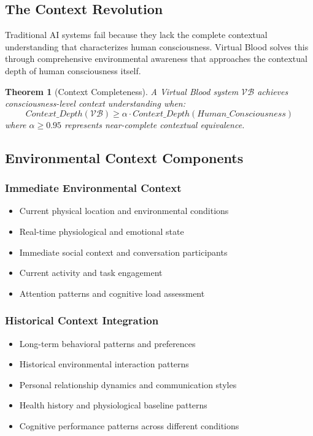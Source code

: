 \documentclass[12pt,a4paper]{article}
\newtheorem{theorem}{Theorem}
\begin{document}
\subsection{The Context Revolution}

Traditional AI systems fail because they lack the complete contextual understanding that characterizes human consciousness. Virtual Blood solves this through comprehensive environmental awareness that approaches the contextual depth of human consciousness itself.

\begin{theorem}[Context Completeness]
A Virtual Blood system $\mathcal{VB}$ achieves consciousness-level context understanding when:
\begin{equation}
Context\_Depth(\mathcal{VB}) \geq \alpha \cdot Context\_Depth(Human\_Consciousness)
\end{equation}
where $\alpha \geq 0.95$ represents near-complete contextual equivalence.
\end{theorem}

\subsection{Environmental Context Components}

\subsubsection{Immediate Environmental Context}
\begin{itemize}
\item Current physical location and environmental conditions
\item Real-time physiological and emotional state
\item Immediate social context and conversation participants  
\item Current activity and task engagement
\item Attention patterns and cognitive load assessment
\end{itemize}

\subsubsection{Historical Context Integration}
\begin{itemize}
\item Long-term behavioral patterns and preferences
\item Historical environmental interaction patterns
\item Personal relationship dynamics and communication styles
\item Health history and physiological baseline patterns
\item Cognitive performance patterns across different conditions
\end{itemize}
\end{document}
